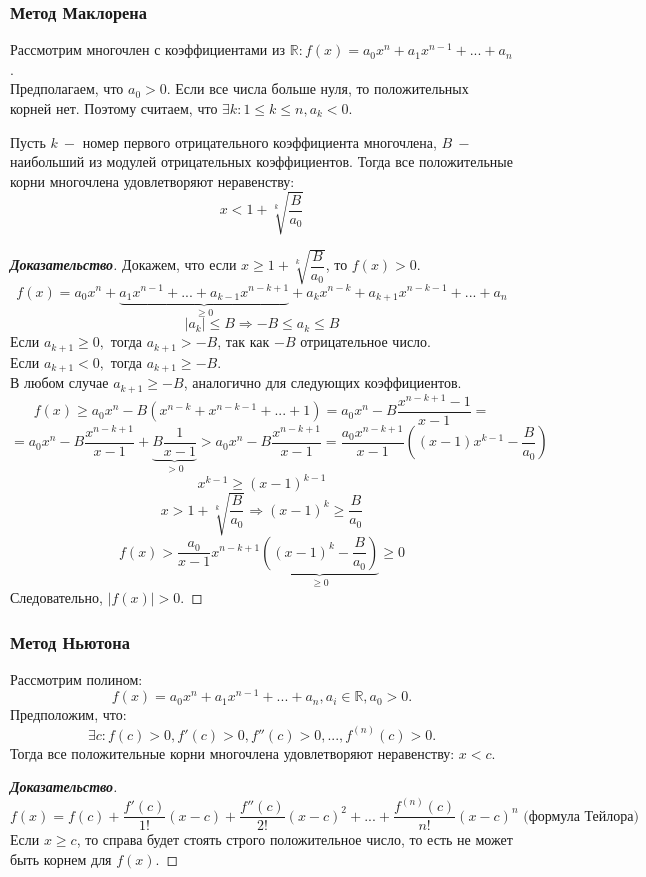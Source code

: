 \documentclass[12pt]{article}
\begin{document}
\subsubsection{Метод Маклорена}
\indent \indent Рассмотрим многочлен с коэффициентами из $\mathbb{R}: f(x) = a_0x^n + a_1x^{n-1} + ... + a_n$. \\
Предполагаем, что $a_0 > 0$. Если все числа больше нуля, то положительных корней нет. Поэтому считаем, что $\exists k: 1 \leq k  \leq n, a_k < 0.$ 
\begin{thm}
Пусть $k~-$ номер первого отрицательного коэффициента многочлена, $B~-$ наибольший из модулей отрицательных коэффициентов. Тогда все положительные корни многочлена удовлетворяют неравенству:
$$x < 1 + \sqrt[k]{\frac{B}{a_0}}$$
\end{thm}
\begin{proof}[\textbf{Доказательство}]
Докажем, что если $x \geq 1 + \sqrt[k]{\dfrac{B}{a_0}}$, то $f(x) > 0$. \\
$$f(x) =  a_0x^n + \underbrace{a_1x^{n-1} + ... + a_{k-1}x^{n-k+1}}_{\geq 0} + a_kx^{n-k} + a_{k+1}x^{n-k-1} + ... + a_n$$
$$|a_k| \leq B \Rightarrow -B \leq a_k \leq B$$
\indent Если $a_{k+1} \geq 0,$ тогда $a_{k+1} > -B$, так как $-B$ отрицательное число. \\
\indent Если $a_{k+1} < 0,$ тогда $a_{k+1} \geq -B$. \\
\indent В любом случае $a_{k+1} \geq -B$, аналогично для следующих коэффициентов.
$$f(x) \geq a_0x^n - B(x^{n-k} + x^{n-k-1} + ... + 1) = a_0x^n - B\frac{x^{n-k+1} - 1}{x - 1} =$$
$$= a_0x^n - B\frac{x^{n-k+1}}{x - 1} + \underbrace{B\frac{1}{x - 1}}_{>0} > a_0x^n - B\frac{x^{n-k+1}}{x - 1}
= \frac{a_0x^{n-k+1}}{x-1}((x-1)x^{k-1} - \frac{B}{a_0})$$
$$x^{k-1} \geq (x-1)^{k-1}$$
$$x > 1 + \sqrt[k]{\dfrac{B}{a_0}} \Rightarrow (x-1)^k \geq \frac{B}{a_0}$$
$$f(x) > \frac{a_0}{x-1}x^{n-k+1}\underbrace{((x-1)^k - \frac{B}{a_0})}_{\geq 0} \geq 0$$
\indent Следовательно, $|f(x)| > 0$.
\end{proof}
\subsubsection{Метод Ньютона}
\begin{thm}
Рассмотрим полином: $$f(x) = a_0x^n + a_1x^{n-1} + ... + a_n, a_i \in \mathbb{R}, a_0 > 0.$$ Предположим, что: $$\exists c: f(c) > 0, f'(c) > 0, f''(c) > 0, ..., f^{(n)}(c) > 0.$$ Тогда все положительные корни многочлена удовлетворяют неравенству: $x < c$.
\end{thm}
\begin{proof}[\textbf{Доказательство}]
$$f(x) = f(c) + \frac{f'(c)}{1!}(x-c) + \frac{f''(c)}{2!}(x-c)^2 + ... + \frac{f^{(n)}(c)}{n!}(x-c)^n \text{ (формула Тейлора)}$$
\indent Если $x \geq c$, то справа будет стоять строго положительное число, то есть не может быть корнем для $f(x)$.
\end{proof}
\end{document}
